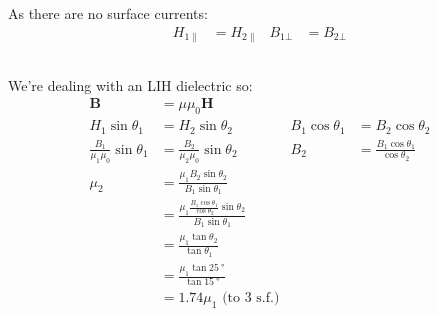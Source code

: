 \subsection{}
As there are no surface currents:
\begin{align*}
    H_{1\parallel} & = H_{2\parallel} & B_{1\bot} & = B_{2\bot}
\end{align*}

\subsection{}
We're dealing with an LIH dielectric so:
\begin{align*}
    \mathbf{B} & = \mu \mu_0 \mathbf{H}\\
    H_1 \sin{\theta_1} & = H_2 \sin{\theta_2} & B_1 \cos{\theta_1} & = B_2 \cos{\theta_2}\\
    \frac{B_1}{\mu_1 \mu_0}\sin{\theta_1} & = \frac{B_2}{\mu_2 \mu_0}\sin{\theta_2} & B_2 & = \frac{B_1 \cos{\theta_1}}{\cos{\theta_2}}\\
    \mu_2 & = \frac{\mu_1 B_2 \sin{\theta_2}}{B_1 \sin{\theta_1}}\\
    & = \frac{\mu_1 \frac{B_1 \cos{\theta_1}}{\cos{\theta_2}} \sin{\theta_2}}{B_1 \sin{\theta_1}}\\
    & = \frac{\mu_1 \tan{\theta_2}}{\tan{\theta_1}}\\
    & = \frac{\mu_1 \tan{\SI{25}{\degree}}}{\tan{\SI{15}{\degree}}}\\
    & = 1.74 \mu_1 \textrm{ (to 3 s.f.)}
\end{align*}
